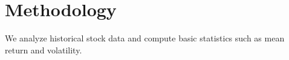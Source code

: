 \section{Methodology}

We analyze historical stock data and compute basic statistics such as mean return and volatility.
